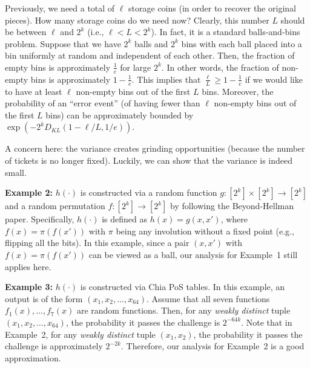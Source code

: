 \documentclass[12pt,draftcls,onecolumn]{IEEEtran}
\begin{document}
Previously, we need a total of $\ell$ storage coins (in order to recover the original pieces). How many storage coins do we need now?
Clearly, this number $L$ should be between $\ell$ and $2^k$ (i.e., $\ell < L < 2^k$).
In fact, it is a standard balls-and-bins problem. 
Suppose that we have $2^k$ balls and $2^k$ bins with each ball placed into a bin uniformly at random and independent of each other.
Then, the fraction of empty bins is approximately $\frac{1}{e}$ for large $2^k$.
In other words, the fraction of non-empty bins is approximately $1 - \frac{1}{e}$.
This implies that $\frac{\ell}{L} \ge 1 - \frac{1}{e}$ if we would like to have at least $\ell$ non-empty bins out of the first $L$ bins. 
Moreover, the probability of an ``error event'' (of having fewer than $\ell$ non-empty bins out of the first $L$ bins) can be approximately bounded by $\exp\left(- 2^k D_{KL}(1 - \ell/L, 1/e) \right)$. 


A concern here: the variance creates grinding opportunities (because the number of tickets is no longer fixed). Luckily, we can show that the variance is indeed small.

{\bf Example 2:} $h(\cdot)$ is constructed via a random function $g : [2^k] \times [2^k] \to [2^k]$
and a random permutation $f: [2^k] \to [2^k]$ by following the Beyond-Hellman paper. Specifically, 
$h(\cdot)$ is defined as $h(x) = g(x, x')$, where $f(x) = \pi( f(x') )$ with $\pi$ being any involution
without a fixed point (e.g., flipping all the bits). In this example, since a pair $(x, x')$ with $f(x) = \pi( f(x') )$ can be viewed as a ball, our analysis for Example~1 still applies here. 

{\bf Example 3:} $h(\cdot)$ is constructed via Chia PoS tables. In this example, an output is of the form $(x_1, x_2, \ldots, x_{64})$. Assume that all seven functions $f_1(x), \ldots, f_7(x)$  are random functions.
Then, for any \emph{weakly distinct} tuple $(x_1, x_2, \ldots, x_{64})$, the probability it passes the challenge is $2^{-64k}$.
Note that in Example~2, for any \emph{weakly distinct} tuple $(x_1, x_2)$, the probability it passes the challenge is approximately $2^{-2k}$. Therefore, our analysis for Example~2 is a good approximation.
\end{document}
